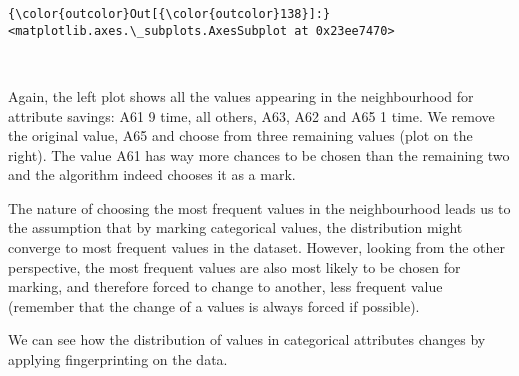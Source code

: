 \documentclass[11pt]{article}
\begin{document}
\begin{Verbatim}[commandchars=\\\{\}]
{\color{outcolor}Out[{\color{outcolor}138}]:} <matplotlib.axes.\_subplots.AxesSubplot at 0x23ee7470>
\end{Verbatim}
            
    \begin{center}
    \end{center}
    { \hspace*{\fill} \\}
    
    Again, the left plot shows all the values appearing in the neighbourhood
for attribute savings: A61 9 time, all others, A63, A62 and A65 1 time.
We remove the original value, A65 and choose from three remaining values
(plot on the right). The value A61 has way more chances to be chosen
than the remaining two and the algorithm indeed chooses it as a mark.

    The nature of choosing the most frequent values in the neighbourhood
leads us to the assumption that by marking categorical values, the
distribution might converge to most frequent values in the dataset.
However, looking from the other perspective, the most frequent values
are also most likely to be chosen for marking, and therefore forced to
change to another, less frequent value (remember that the change of a
values is always forced if possible).

We can see how the distribution of values in categorical attributes
changes by applying fingerprinting on the data.


    
    
    
    
\end{document}
